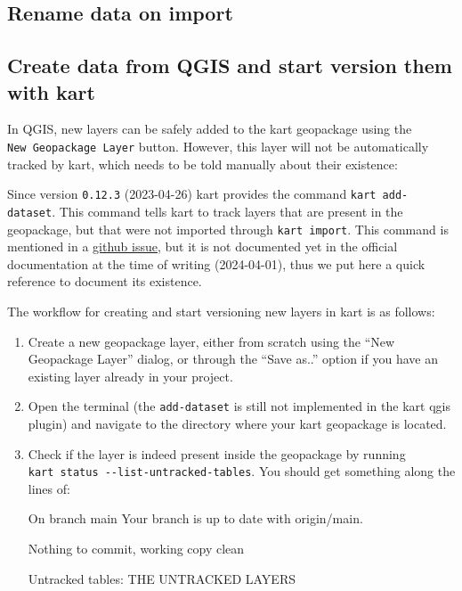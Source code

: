 \documentclass[
  letterpaper,
  DIV=11,
  numbers=noendperiod]{scrartcl}
\newenvironment{Shaded}{\begin{snugshade}}{\end{snugshade}}
\newcommand{\ExtensionTok}[1]{\textcolor[rgb]{0.55,0.91,0.99}{#1}}
\newcommand{\NormalTok}[1]{\textcolor[rgb]{0.97,0.97,0.95}{#1}}
\newcommand{\StringTok}[1]{\textcolor[rgb]{0.95,0.98,0.55}{#1}}
\begin{document}
\subsection{\texorpdfstring{\textbf{Rename data on
import}}{Rename data on import}}\label{rename-data-on-import}

\subsection{\texorpdfstring{\textbf{Create data from QGIS and start
version them with
kart}}{Create data from QGIS and start version them with kart}}\label{create-data-from-qgis-and-start-version-them-with-kart}

In QGIS, new layers can be safely added to the kart geopackage using the
\texttt{New\ Geopackage\ Layer} button. However, this layer will not be
automatically tracked by kart, which needs to be told manually about
their existence:

Since version \texttt{0.12.3} (2023-04-26) kart provides the command
\texttt{kart\ add-dataset}. This command tells kart to track layers that
are present in the geopackage, but that were not imported through
\texttt{kart\ import}. This command is mentioned in a
\href{https://github.com/koordinates/kart/issues/830}{github issue}, but
it is not documented yet in the official documentation at the time of
writing (2024-04-01), thus we put here a quick reference to document its
existence.

The workflow for creating and start versioning new layers in kart is as
follows:

\begin{enumerate}
\def\labelenumi{\arabic{enumi}.}
\item
  Create a new geopackage layer, either from scratch using the ``New
  Geopackage Layer'' dialog, or through the ``Save as..'' option if you
  have an existing layer already in your project.
\item
  Open the terminal (the \texttt{add-dataset} is still not implemented
  in the kart qgis plugin) and navigate to the directory where your kart
  geopackage is located.
\item
  Check if the layer is indeed present inside the geopackage by running
  \texttt{kart\ status\ -\/-list-untracked-tables}. You should get
  something along the lines of:

\begin{Shaded}
\begin{Highlighting}[]
\ExtensionTok{On}\NormalTok{ branch main}
\ExtensionTok{Your}\NormalTok{ branch is up to date with }\StringTok{\textquotesingle{}origin/main\textquotesingle{}}\NormalTok{.}

\ExtensionTok{Nothing}\NormalTok{ to commit, working copy clean}

\ExtensionTok{Untracked}\NormalTok{ tables:}
  \ExtensionTok{THE}\NormalTok{ UNTRACKED LAYERS}
\end{Highlighting}
\end{Shaded}
\end{enumerate}
\end{document}
